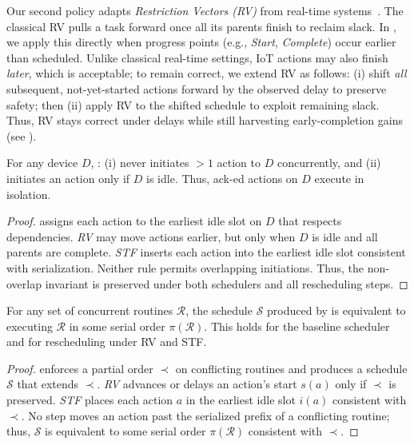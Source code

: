 Our second policy adapts \emph{Restriction Vectors (RV)} from real-time systems~\cite{manimaran1997new}.  
The classical RV pulls a task forward once all its parents finish to reclaim slack.
In \sysname{}, we apply this directly when progress points (e.g., \textit{Start}, \textit{Complete}) occur earlier than scheduled.
Unlike classical real-time settings, IoT actions may also finish \emph{later}, which is acceptable; to remain correct, we extend RV as follows:
(i) shift \textit{all} subsequent, not-yet-started actions forward by the observed delay to preserve safety; then
(ii) apply RV to the shifted schedule to exploit remaining slack.
Thus, RV stays correct under delays while still harvesting early-completion gains (see ).

\begin{theorem}
\label{rasc:thm:safety}
For any device $D$, \sysname{}: (i) never initiates $>1$  action to $D$ concurrently, and  (ii) initiates an action only if $D$ is idle. Thus, ack-ed actions on $D$ execute in isolation.
\end{theorem}
\begin{proof}
\emph{\scheduler} assigns each action to the earliest idle slot on $D$ that respects dependencies.  
\emph{RV} may move actions earlier, but only when $D$ is idle and all parents are complete.
\emph{STF} inserts each action into the earliest idle slot consistent with serialization. Neither rule permits overlapping initiations.  
Thus, the non-overlap invariant is preserved under both schedulers and all rescheduling steps.
\end{proof}

\begin{theorem}
\label{rasc:thm:serial}
For any set of concurrent routines $\mathcal{R}$, the schedule $\mathcal{S}$ produced by \sysname{} is equivalent to executing $\mathcal{R}$ in some serial order $\pi(\mathcal{R})$.
This holds for the baseline scheduler and for rescheduling under RV and STF.
\end{theorem}
\begin{proof}
\emph{\scheduler} enforces a partial order $\prec$ on conflicting routines and produces a schedule $\mathcal{S}$ that extends $\prec$.
\emph{RV} 
advances or delays an action's start $s(a)$ only if $\prec$ is preserved.
\emph{STF} places each action $a$ in the earliest idle slot $i(a)$ consistent with $\prec$.
No step moves an action past the serialized prefix of a conflicting routine;
thus, $\mathcal{S}$ is equivalent to some serial order $\pi(\mathcal{R})$ consistent with $\prec$.
\end{proof}
